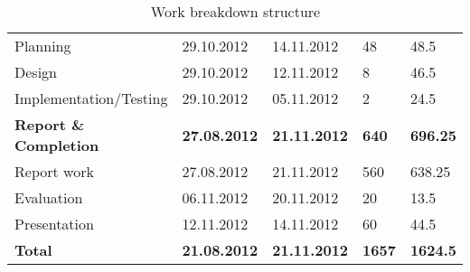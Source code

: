 \begin{table}
\begin{center}
\begin{tabular}{ l|l|l|l|l }
Planning & 29.10.2012 & 14.11.2012 & 48 & 48.5\\
Design & 29.10.2012 & 12.11.2012 & 8 & 46.5 \\
Implementation/Testing & 29.10.2012 & 05.11.2012 & 2 & 24.5\\ \hline
\textbf{Report \& Completion} & \bf{27.08.2012} & \bf{21.11.2012} & \bf{640} & \bf{696.25}\\ \hline
Report work & 27.08.2012 & 21.11.2012 & 560 & 638.25\\
Evaluation & 06.11.2012 & 20.11.2012 & 20 & 13.5\\
Presentation &12.11.2012 & 14.11.2012 & 60 & 44.5\\ \hline
\bf{Total} & \bf{21.08.2012} & \textbf{21.11.2012} & \bf{1657} & \bf{1624.5} \\ \hline
\end{tabular}
\caption{Work breakdown structure} \label{table:wbs}
\end{center}
\end{table}
